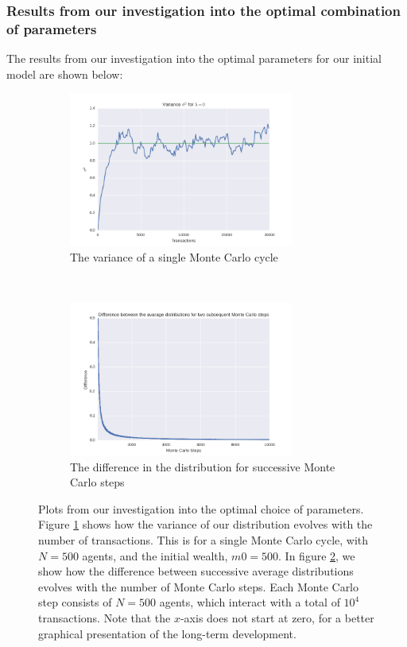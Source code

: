 \documentclass[a4paper, 10pt]{article}
\begin{document}
\subsubsection{Results from our investigation into the optimal combination of parameters}
The results from our investigation into the optimal parameters for our initial model are shown below:
\begin{figure}[!ht]
    \centering
    \begin{subfigure}[H!]{0.5\textwidth}
        \centering
        \includegraphics[height=2.0in]{varLamb0.png}
        \caption{The variance of a single Monte Carlo cycle}\label{fig:ModelA_Var}
    \end{subfigure}%
    ~ 
    \begin{subfigure}[H!]{0.5\textwidth}
        \centering
        \includegraphics[height=2.0in]{diffMCLamb0.png}
        \caption{The difference in the distribution for successive Monte Carlo steps}\label{fig:ModelA_MC_steps}
    \end{subfigure}
    \caption{Plots from our investigation into the optimal choice of parameters. Figure \ref{fig:ModelA_Var} shows how the variance of our distribution evolves with the number of transactions. This is for a single Monte Carlo cycle, with $N=500$ agents, and the initial wealth, $m0=500$. In figure \ref{fig:ModelA_MC_steps}, we show how the difference between successive average distributions evolves with the number of Monte Carlo steps. Each Monte Carlo step consists of $N=500$ agents, which interact with a total of $10^4$ transactions. Note that the $x$-axis does not start at zero, for a better graphical presentation of the long-term development.}\label{fig:ModelA}
\end{figure} %
\end{document}
